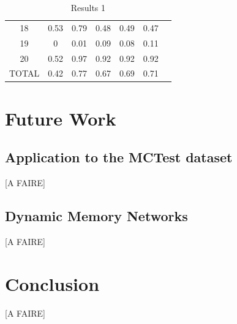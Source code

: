 \documentclass[twoside,11pt]{article}
\begin{document}
\begin{table}[H]
{\begin{tabular}{|c|c|c|c|c|c|c|}
18    & 0.53                                                           & 0.79                                                                                     & 0.48                                                                               & 0.49                                                                               & 0.47                                                                               &                                                                                       \\ \cline{1-1}
19    & 0                                                              & 0.01                                                                                     & 0.09                                                                               & 0.08                                                                               & 0.11                                                                               &                                                                                       \\ \cline{1-1}
20    & 0.52                                                           & 0.97                                                                                     & 0.92                                                                               & 0.92                                                                               & 0.92                                                                               &                                                                                       \\ \hline
TOTAL & 0.42                                                           & 0.77                                                                                     & 0.67                                                                               & 0.69                                                                               & 0.71                                                                               &                                                                                       \\ \hline
\end{tabular}
}
\caption{Results 1}
\end{table}

\section{Future Work}
\subsection{Application to the MCTest dataset}
[A FAIRE]
\subsection{Dynamic Memory Networks}
[A FAIRE]
\section{Conclusion}
[A FAIRE]
\vskip 0.2in

\end{document}

